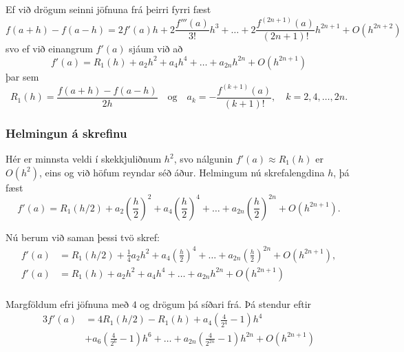 \documentclass[icelandic,a4paper,12pt]{article}
\begin{document}
\pause
Ef við drögum seinni jöfnuna  frá þeirri fyrri fæst
{\small\begin{equation*}
  f(a+h)-f(a-h) = 2f'(a)h + 2\frac{f'''(a)}{3!}h^3
  + \ldots + 2\frac{f^{(2n+1)}(a)}{(2n+1)!}h^{2n+1} + O(h^{2n+2})
\end{equation*}}\pause
svo ef við einangrum $f'(a)$ sjáum við að
\begin{equation*}
  f'(a) = R_1(h) 
  + a_2 h^2 + a_4 h^4 + \ldots + a_{2n} h^{2n} + O(h^{2n+1})
\end{equation*}
þar sem
\begin{equation*}
  R_1(h) = \frac{f(a+h)-f(a-h)}{2h}
  \quad \text{og} \quad
  a_k = -\frac{f^{(k+1)}(a)}{(k+1)!},
  \quad k = 2,4,\ldots,2n.
\end{equation*}



\subsubsection{Helmingun á skrefinu} 
Hér er minnsta veldi í skekkjuliðnum $h^2$, svo nálgunin $f'(a)
\approx R_1(h)$ er $O(h^2)$, eins og við höfum reyndar séð
áður. Helmingum nú skrefalengdina $h$, þá fæst 
\begin{equation*}
  f'(a) = R_1(h/2) + a_2 \left(\frac{h}{2}\right)^2
  + a_4 \left(\frac{h}{2}\right)^4 + \ldots
  + a_{2n} \left(\frac{h}{2}\right)^{2n} + O(h^{2n+1}).
\end{equation*}



Nú berum við saman þessi tvö skref:
\begin{align*}
  f'(a) &= R_1(h/2) + \tfrac 14 a_2 h^2
  + a_4 \left(\frac{h}{2}\right)^4 + \ldots
  + a_{2n} \left(\frac{h}{2}\right)^{2n} + O(h^{2n+1}),\\
  f'(a) &= R_1(h) 
  + a_2 h^2 + a_4 h^4 + \ldots + a_{2n} h^{2n} + O(h^{2n+1})\\
\end{align*}

\pause
Margföldum efri jöfnuna með $4$ og drögum þá síðari frá.  Þá stendur
eftir
\begin{align*}
  3f'(a) &= 4 R_1(h/2) - R_1(h) 
  + a_4 \left( \frac{4}{2^4} - 1 \right)h^4 \\
  &+ a_6 \left( \frac{4}{2^6} - 1 \right)h^6
  + \ldots
  + a_{2n} \left( \frac{4}{2^{2n}} - 1 \right)h^{2n}
  + O(h^{2n+1})
\end{align*}
\end{document}
